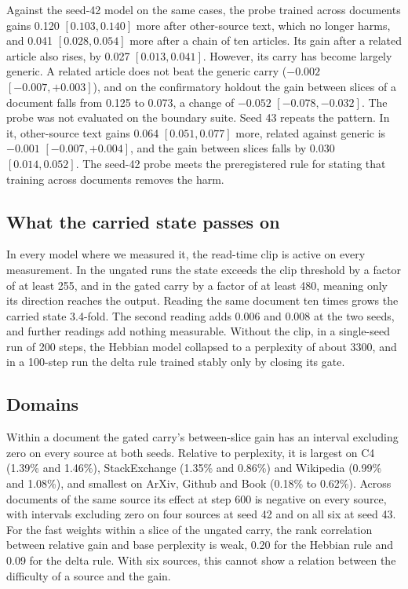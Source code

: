 \documentclass[12pt,a4paper]{report}
\begin{document}
Against the seed-42 model on the same cases, the probe trained across documents gains 0.120 $[0.103, 0.140]$ more after other-source text, which no longer harms, and 0.041 $[0.028, 0.054]$ more after a chain of ten articles. Its gain after a related article also rises, by 0.027 $[0.013, 0.041]$. However, its carry has become largely generic. A related article does not beat the generic carry ($-0.002$ $[-0.007, +0.003]$), and on the confirmatory holdout the gain between slices of a document falls from 0.125 to 0.073, a change of $-0.052$ $[-0.078, -0.032]$. The probe was not evaluated on the boundary suite. Seed 43 repeats the pattern. In it, other-source text gains 0.064 $[0.051, 0.077]$ more, related against generic is $-0.001$ $[-0.007, +0.004]$, and the gain between slices falls by 0.030 $[0.014, 0.052]$. The seed-42 probe meets the preregistered rule for stating that training across documents removes the harm.

\subsection{What the carried state passes on}

In every model where we measured it, the read-time clip is active on every measurement. In the ungated runs the state exceeds the clip threshold by a factor of at least 255, and in the gated carry by a factor of at least 480, meaning only its direction reaches the output. Reading the same document ten times grows the carried state 3.4-fold. The second reading adds 0.006 and 0.008 at the two seeds, and further readings add nothing measurable. Without the clip, in a single-seed run of 200 steps, the Hebbian model collapsed to a perplexity of about 3300, and in a 100-step run the delta rule trained stably only by closing its gate.

\subsection{Domains}

Within a document the gated carry's between-slice gain has an interval excluding zero on every source at both seeds. Relative to perplexity, it is largest on C4 (1.39\% and 1.46\%), StackExchange (1.35\% and 0.86\%) and Wikipedia (0.99\% and 1.08\%), and smallest on ArXiv, Github and Book (0.18\% to 0.62\%). Across documents of the same source its effect at step 600 is negative on every source, with intervals excluding zero on four sources at seed 42 and on all six at seed 43. For the fast weights within a slice of the ungated carry, the rank correlation between relative gain and base perplexity is weak, 0.20 for the Hebbian rule and 0.09 for the delta rule. With six sources, this cannot show a relation between the difficulty of a source and the gain.
\end{document}
